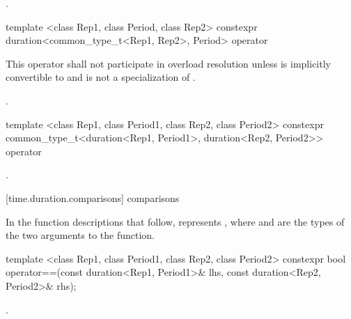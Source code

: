 \begin{itemdescr}
\pnum
\returns {}.
\end{itemdescr}

%
\begin{itemdecl}
template <class Rep1, class Period, class Rep2>
  constexpr duration<common_type_t<Rep1, Rep2>, Period>
  operator%
\end{itemdecl}

\begin{itemdescr}
\pnum
\remarks This operator shall not participate in overload
resolution unless  is implicitly convertible to  and
 is not a specialization of .

\pnum
\returns {}.
\end{itemdescr}

%
\begin{itemdecl}
template <class Rep1, class Period1, class Rep2, class Period2>
  constexpr common_type_t<duration<Rep1, Period1>, duration<Rep2, Period2>>
  operator%
\end{itemdecl}

\begin{itemdescr}
\pnum
\returns {}.
\end{itemdescr}


[time.duration.comparisons]{ comparisons}

\pnum
In the function descriptions that follow,  represents
, where  and  are the types of
the two arguments to the function.

%
\begin{itemdecl}
template <class Rep1, class Period1, class Rep2, class Period2>
  constexpr bool operator==(const duration<Rep1, Period1>& lhs,
                            const duration<Rep2, Period2>& rhs);
\end{itemdecl}

\begin{itemdescr}
\pnum
\returns {}.
\end{itemdescr}


